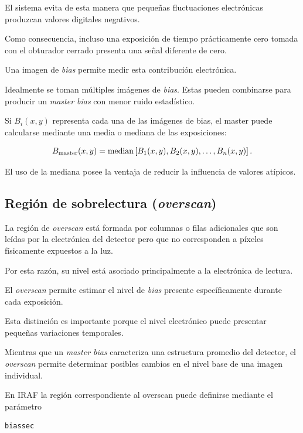 \documentclass[12pt,letterpaper,oneside]{book}
\begin{document}
El sistema evita de esta manera que pequeñas fluctuaciones electrónicas produzcan valores digitales negativos.

Como consecuencia, incluso una exposición de tiempo prácticamente cero tomada con el obturador cerrado presenta una señal diferente de cero.

Una imagen de \textit{bias} permite medir esta contribución electrónica.

Idealmente se toman múltiples imágenes de \textit{bias}. Estas pueden combinarse para producir un \textit{master bias} con menor ruido estadístico.

Si $B_i(x,y)$ representa cada una de las imágenes de bias, el master puede calcularse mediante una media o mediana de las exposiciones:

\[
B_{\rm master}(x,y)
=
{\rm median}
\left[
B_1(x,y),
B_2(x,y),
\ldots,
B_n(x,y)
\right].
\]

El uso de la mediana posee la ventaja de reducir la influencia de valores atípicos.



\subsection{Región de sobrelectura (\textit{overscan})}

La región de \textit{overscan} está formada por columnas o filas adicionales que son leídas por la electrónica del detector pero que no corresponden a píxeles físicamente expuestos a la luz.

Por esta razón, su nivel está asociado principalmente a la electrónica de lectura.

El \textit{overscan} permite estimar el nivel de \textit{bias} presente específicamente durante cada exposición.

Esta distinción es importante porque el nivel electrónico puede presentar pequeñas variaciones temporales.

Mientras que un \textit{master bias} caracteriza una estructura promedio del detector, el \textit{overscan} permite determinar posibles cambios en el nivel base de una imagen individual.

En IRAF la región correspondiente al overscan puede definirse mediante el parámetro

\begin{verbatim}
biassec
\end{verbatim}
\end{document}
